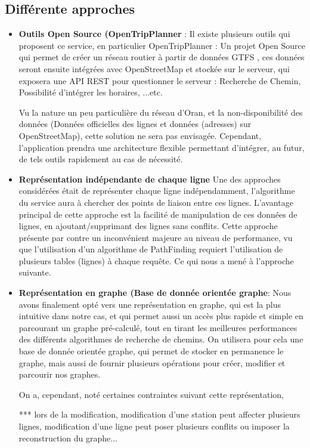 \subsection{Différente approches}
\begin{itemize}
	\item \textbf{Outils Open Source (OpenTripPlanner} : 
	      Il existe plusieurs outils qui proposent ce service, en particulier OpenTripPlanner : Un projet Open Source qui permet de créer un réseau routier à partir de données GTFS , ces données seront ensuite intégrées avec OpenStreetMap et stockée sur le serveur, qui exposera une API REST pour questionner le serveur : Recherche de Chemin, Possibilité d'intégrer les horaires, ...etc.
	      		
	      Vu la nature un peu particulière du réseau d'Oran, et la non-disponibilité des données (Données officielles des lignes et données (adresses) sur OpenStreetMap), cette solution ne sera pas envisagée. 
	      Cependant, l'application prendra une architecture flexible permettant d'intégrer, au futur, de tels outils rapidement au cas de nécessité.
	\item \textbf{Représentation indépendante de chaque ligne}
	      Une des approches considérées était de représenter chaque ligne indépendamment, l'algorithme du service aura à chercher des points de liaison entre ces lignes.
	      L'avantage principal de cette approche est la facilité de manipulation de ces données de lignes, en ajoutant/supprimant des lignes sans conflits.
	      Cette approche présente par contre un inconvénient majeure au niveau de performance, vu que l'utilisation d'un algorithme de PathFinding requiert l'utilisation de plusieurs tables (lignes) à chaque requête. Ce qui nous a mené à l'approche suivante.
	\item \textbf{Représentation en graphe (Base de donnée orientée graphe}: Nous avons finalement opté vers une représentation en graphe, qui est la plus intuitive dans notre cas, et qui permet aussi un accès plus rapide et simple en parcourant un graphe pré-calculé, tout en tirant les meilleures performances des différents algorithmes de recherche de chemins.
	On utilisera pour cela une base de donnée orientée graphe, qui permet de stocker en permanence le graphe, mais aussi de fournir plusieurs opérations pour créer, modifier et parcourir nos graphes.
	
	On a, cependant, noté certaines contraintes suivant cette représentation, 
	
	*** lors de la modification, modification d'une station peut affecter plusieurs lignes, modification d'une ligne peut poser plusieurs conflits ou imposer la reconstruction du graphe...
	     
\end{itemize}
